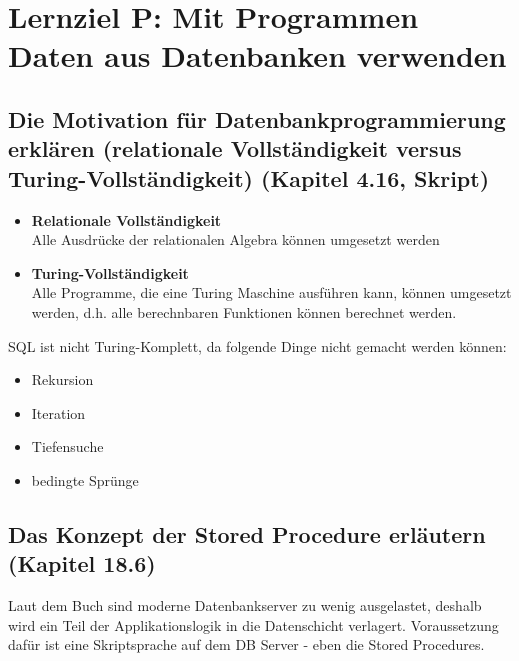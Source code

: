 \section{Lernziel P: Mit Programmen Daten aus Datenbanken verwenden}

\subsection{Die Motivation für Datenbankprogrammierung erklären (relationale Vollständigkeit versus Turing-Vollständigkeit) (Kapitel 4.16, Skript)}

\begin{itemize}
    \item \textbf{Relationale Vollständigkeit} \\
    Alle Ausdrücke der relationalen Algebra können umgesetzt werden
    \item \textbf{Turing-Vollständigkeit} \\
    Alle Programme, die eine Turing Maschine ausführen kann, können umgesetzt werden, d.h. alle berechnbaren Funktionen können berechnet werden.
\end{itemize}

SQL ist nicht Turing-Komplett, da folgende Dinge nicht gemacht werden können:

\begin{itemize}
    \item Rekursion
    \item Iteration
    \item Tiefensuche
    \item bedingte Sprünge
\end{itemize}

\subsection{Das Konzept der Stored Procedure erläutern (Kapitel 18.6)}

Laut dem Buch sind moderne Datenbankserver zu wenig ausgelastet, deshalb wird ein Teil der Applikationslogik in die Datenschicht verlagert. Voraussetzung dafür ist eine Skriptsprache auf dem DB Server - eben die Stored Procedures. \\
